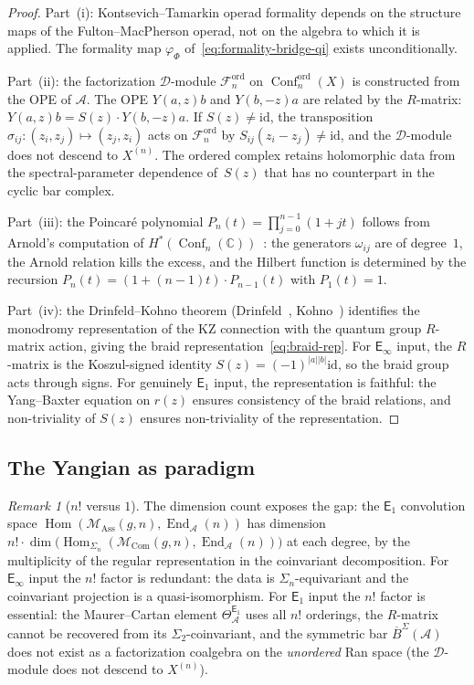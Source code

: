 \documentclass[11pt,reqno]{amsart}
\theoremstyle{definition}
\theoremstyle{remark}
\newtheorem{remark}[theorem]{Remark}
\newcommand{\cA}{\mathcal{A}}
\newcommand{\cD}{\mathcal{D}}
\newcommand{\cF}{\mathcal{F}}
\newcommand{\cM}{\mathcal{M}}
\newcommand{\Eone}{\mathsf{E}_{1}}
\newcommand{\Einf}{\mathsf{E}_{\infty}}
\newcommand{\Ass}{\mathrm{Ass}}
\newcommand{\Com}{\mathrm{Com}}
\DeclareMathOperator{\Hom}{Hom}
\DeclareMathOperator{\End}{End}
\DeclareMathOperator{\Conf}{Conf}
\newcommand{\BarSig}{\overline{B}^{\Sigma}}
\newcommand{\CC}{\mathbb{C}}
\newcommand{\id}{\mathrm{id}}
\numberwithin{equation}{section}
\begin{document}
\begin{proof}
Part~(i): Kontsevich--Tamarkin operad formality depends on the
structure maps of the Fulton--MacPherson operad, not on the
algebra to which it is applied. The formality map
$\varphi_\Phi$ of~\eqref{eq:formality-bridge-qi} exists
unconditionally.

Part~(ii): the factorization $\cD$-module $\cF_n^{\mathrm{ord}}$
on $\Conf_n^{\mathrm{ord}}(X)$ is constructed from the OPE of
$\cA$. The OPE $Y(a,z)b$ and $Y(b,-z)a$ are related by the
$R$-matrix: $Y(a,z)b = S(z) \cdot Y(b,-z)a$. If
$S(z) \neq \id$, the transposition
$\sigma_{ij}\colon (z_i, z_j) \mapsto (z_j, z_i)$ acts on
$\cF_n^{\mathrm{ord}}$ by $S_{ij}(z_i - z_j) \neq \id$, and the
$\cD$-module does not descend to $X^{(n)}$. The ordered complex
retains holomorphic data from the spectral-parameter dependence
of~$S(z)$ that has no counterpart in the cyclic bar complex.

Part~(iii): the Poincar\'e polynomial
$P_n(t) = \prod_{j=0}^{n-1}(1 + jt)$ follows from
Arnold's computation of $H^*(\Conf_n(\CC))$~\cite{Arnold69}:
the generators $\omega_{ij}$ are of degree~$1$, the Arnold
relation kills the excess, and the Hilbert function is
determined by the recursion $P_n(t) = (1 + (n-1)t)\cdot P_{n-1}(t)$
with $P_1(t) = 1$.

Part~(iv): the Drinfeld--Kohno theorem
(Drinfeld~\cite{Drinfeld91}, Kohno~\cite{Kohno85})
identifies the monodromy representation of the KZ connection
with the quantum group $R$-matrix action, giving the braid
representation~\eqref{eq:braid-rep}.
For $\Einf$ input, the $R$-matrix is the Koszul-signed identity
$S(z) = (-1)^{|a||b|}\id$, so the braid group acts through
signs. For genuinely $\Eone$ input, the representation is
faithful: the Yang--Baxter equation on $r(z)$ ensures
consistency of the braid relations, and non-triviality of $S(z)$
ensures non-triviality of the representation.
\end{proof}

\subsection{The Yangian as paradigm}

\begin{remark}[$n!$ versus $1$]
\label{rem:n-factorial-vs-1}
The dimension count exposes the gap: the $\Eone$ convolution space
$\Hom(\cM_\Ass(g,n), \End_\cA(n))$ has dimension
$n! \cdot \dim\bigl(\Hom_{\Sigma_n}(\cM_\Com(g,n),
\End_\cA(n))\bigr)$ at each degree, by the multiplicity of the
regular representation in the coinvariant decomposition. For
$\Einf$ input the $n!$ factor is redundant: the data is
$\Sigma_n$-equivariant and the coinvariant projection is a
quasi-isomorphism. For $\Eone$ input the $n!$ factor is essential:
the Maurer--Cartan element $\Theta^{\Eone}_\cA$ uses all $n!$
orderings, the $R$-matrix cannot be recovered from its
$\Sigma_2$-coinvariant, and the symmetric bar $\BarSig(\cA)$
does not exist as a factorization coalgebra on the
\emph{unordered} Ran space (the $\cD$-module does not descend to
$X^{(n)}$).
\end{remark}
\end{document}
